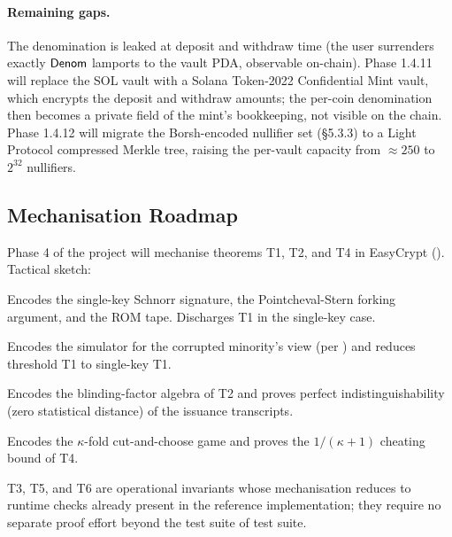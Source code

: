 \paragraph{Remaining gaps.} The denomination is leaked at deposit and
withdraw time (the user surrenders exactly $\mathsf{Denom}$ lamports to the vault
PDA, observable on-chain). Phase 1.4.11 will replace the SOL vault with
a Solana Token-2022 Confidential Mint vault, which encrypts the deposit
and withdraw amounts; the per-coin denomination then becomes a private
field of the mint's bookkeeping, not visible on the chain. Phase 1.4.12
will migrate the Borsh-encoded nullifier set
(\S5.3.3) to a Light Protocol compressed Merkle
tree, raising the per-vault capacity from $\approx 250$ to $2^{32}$
nullifiers.

\subsection{Mechanisation Roadmap}
\label{sec:mech-roadmap}

Phase 4 of the project will mechanise theorems T1, T2, and T4 in
EasyCrypt (\cite{easycrypt2013}). Tactical sketch:

\begin{description}[leftmargin=2em,style=nextline]
  \item[\texttt{schnorr.ec}]
    Encodes the single-key Schnorr signature, the
    Pointcheval-Stern forking argument, and the ROM tape. Discharges T1
    in the single-key case.
  \item[\texttt{threshold\_lift.ec}]
    Encodes the simulator for the corrupted minority's view (per
    \cite{stinson-strobl2001}) and reduces threshold T1 to single-key T1.
  \item[\texttt{blind.ec}]
    Encodes the blinding-factor algebra of T2 and proves perfect
    indistinguishability (zero statistical distance) of the issuance
    transcripts.
  \item[\texttt{cut\_choose.ec}]
    Encodes the $\kappa$-fold cut-and-choose game and proves the
    $1/(\kappa+1)$ cheating bound of T4.
\end{description}

T3, T5, and T6 are operational invariants whose mechanisation reduces to
runtime checks already present in the reference implementation; they
require no separate proof effort beyond the test suite of
test suite.
